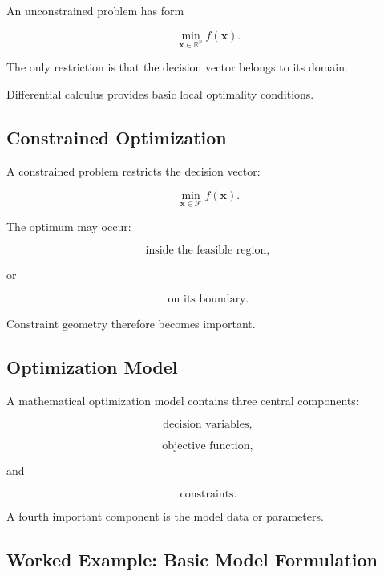 An unconstrained problem has form

\[
\boxed{
\min_{\mathbf{x}\in\mathbb{R}^n}
f(\mathbf{x}).
}
\]

The only restriction is that the decision vector belongs to its domain.

Differential calculus provides basic local optimality conditions.

\subsection{Constrained Optimization}
\label{subsec:constrained-optimization}

A constrained problem restricts the decision vector:

\[
\boxed{
\min_{\mathbf{x}\in\mathcal{F}}
f(\mathbf{x}).
}
\]

The optimum may occur:

\[
\boxed{
\text{inside the feasible region},
}
\]

or

\[
\boxed{
\text{on its boundary}.
}
\]

Constraint geometry therefore becomes important.

\subsection{Optimization Model}
\label{subsec:optimization-model}

A mathematical optimization model contains three central components:

\[
\boxed{
\text{decision variables},
}
\]

\[
\boxed{
\text{objective function},
}
\]

and

\[
\boxed{
\text{constraints}.
}
\]

A fourth important component is the model data or parameters.

\subsection{Worked Example: Basic Model Formulation}
\label{subsec:worked-basic-optimization-model}

